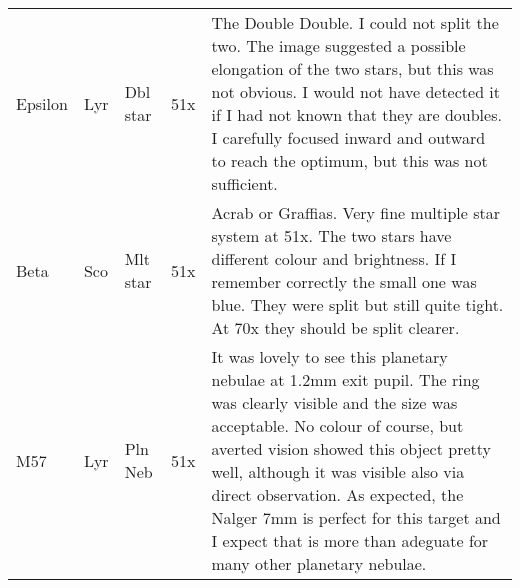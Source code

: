 \begin{longtable}{ p{0.8in}  p{0.3in}  p{0.5in}  p{0.9in}  p{5.8in} }
Epsilon & Lyr & Dbl star & 51x & The Double Double. I could not split the two. The image suggested a possible elongation of the two stars, but this was not obvious. I would not have detected it if I had not known that they are doubles. I carefully focused inward and outward to reach the optimum, but this was not sufficient.  \\ 
Beta & Sco & Mlt star & 51x & Acrab or Graffias. Very fine multiple star system at 51x. The two stars have different colour and brightness. If I remember correctly the small one was blue. They were split but still quite tight. At 70x they should be split clearer.  \\ 
M57 & Lyr & Pln Neb & 51x & It was lovely to see this planetary nebulae at 1.2mm exit pupil. The ring was clearly visible and the size was acceptable. No colour of course, but averted vision showed this object pretty well, although it was visible also via direct observation. As expected, the Nalger 7mm is perfect for this target and I expect that is more than adeguate for many other planetary nebulae. \\ 
\hline 
\end{longtable} 
